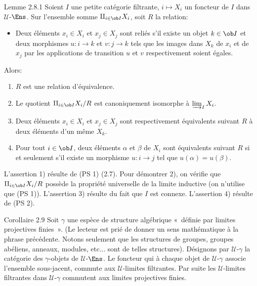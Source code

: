\begin{enonce*}{Lemme 2.8.1}
Soient $I$ une petite catégorie filtrante, $i\mapsto X_i$ un
foncteur de $I$ dans $𝒰$-$\Ens$. Sur l'ensemble somme
$\amalg_{i\in
 \ob I} X_i$, soit $R$ la relation:
\begin{itemize}
\item[(R)] Deux éléments $x_i\in X_i$ et $x_j\in X_j$ sont
  reliés s'il existe un objet $k\in \ob I$ et deux morphismes
  $u:i\rightarrow k$ et $v:j\rightarrow k$ tels que les images dans
  $X_k$ de $x_i$ et de $x_j$ par les applications de transition $u$ et
  $v$ respectivement soient égales.
\end{itemize}
Alors:\pageoriginale
\begin{enumerate}
\renewcommand{\labelenumi}{\theenumi)}
\item $R$ est une relation d'équivalence.

\item Le quotient $\amalg_{i\in \ob I}X_i/R$ est canoniquement isomorphe
  à $\varinjlim_I X_i$.

\item Deux éléments $x_i\in X_i$ et $x_j\in X_j$ sont
  respectivement équivalents suivant $R$ à deux éléments d'un
  même $X_k$.

\item Pour tout $i\in \ob I$, deux éléments $\alpha$ et $\beta$ de $X_i$ sont
  équivalents suivant $R$ si et seulement s'il existe un morphisme
  $u:i\rightarrow j$ tel que $u(\alpha)=u(\beta)$.
\end{enumerate}
\end{enonce*}

L'assertion 1) résulte de (PS 1) (2.7). Pour démontrer 2), on %
vérifie que $\amalg_{i\in \ob I}X_i/R$ possède la propriété
universelle de la limite inductive (on n'utilise que (PS 1)).
L'assertion 3) résulte du fait que $I$ est connexe. L'assertion 4)
résulte de (PS 2).

\begin{enonce*}{Corollaire 2.9}
Soit $%
\gamma$ une espèce de structure algébrique « définie par limites
projectives finies ». (Le lecteur est prié de donner un sens
mathématique à la phrase précédente. Notons seulement que les
structures de groupes, groupes abéliens, anneaux, modules, etc... %
sont de telles structures). Désignons par $𝒰$-$\gamma$ la
catégorie des $\gamma$-objets de $𝒰$-$\Ens$. Le foncteur qui
à chaque objet de $𝒰$-$\gamma$ associe l'ensemble
sous-jacent, commute aux $𝒰$-limites filtrantes. Par suite
les $𝒰$-limites filtrantes dans $𝒰$-$\gamma$
commutent aux limites projectives finies.
\end{enonce*}

